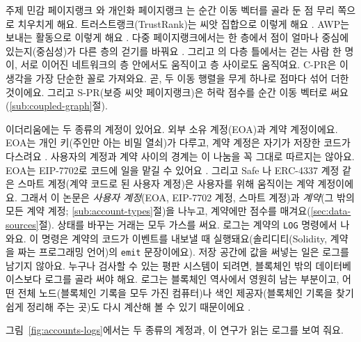 주제 민감 페이지랭크 \parencite{haveliwala2003topic}와 개인화 페이지랭크 \parencite{jeh2003personalized}는 순간 이동 벡터를 골라 둔 점 무리 쪽으로 치우치게 해요. 트러스트랭크(TrustRank)는 씨앗 집합으로 이렇게 해요 \parencite{gyongyi2004trustrank}. AWP는 보내는 활동으로 이렇게 해요 \parencite{do2023awp}. 다중 페이지랭크에서는 한 층에서 점이 얼마나 중심에 있는지(중심성)가 다른 층의 걷기를 바꿔요 \parencite{halu2013multiplex}. 그리고 \textcite{dedomenico2015ranking}의 다층 틀에서는 걷는 사람 한 명이, 서로 이어진 네트워크의 층 안에서도 움직이고 층 사이로도 움직여요. \mbox{C-PR}은 이 생각을 가장 단순한 꼴로 가져와요. 곧, 두 이동 행렬을 무게 하나로 점마다 섞어 더한 것이에요. 그리고 \mbox{S-PR}(보증 씨앗 페이지랭크)은 허락 점수를 순간 이동 벡터로 써요(\ref{sub:coupled-graph}절).


이더리움에는 두 종류의 계정이 있어요. 외부 소유 계정(EOA)과 계약 계정이에요. EOA는 개인 키(주인만 아는 비밀 열쇠)가 다루고, 계약 계정은 자기가 저장한 코드가 다스려요 \parencite{antonopoulos2018mastering}. 사용자의 계정과 계약 사이의 경계는 이 나눔을 꼭 그대로 따르지는 않아요. EOA는 EIP-7702로 코드에 일을 맡길 수 있어요 \parencite{buterin2024eip7702}. 그리고 Safe \parencite{safenddocs}나 ERC-4337 계정 \parencite{buterin2021erc4337} 같은 스마트 계정(계약 코드로 된 사용자 계정)은 사용자를 위해 움직이는 계약 계정이에요. 그래서 이 논문은 \emph{사용자 계정}(EOA, EIP-7702 계정, 스마트 계정)과 \emph{계약}(그 밖의 모든 계약 계정; \ref{sub:account-types}절)을 나누고, 계약에만 점수를 매겨요(\ref{sec:data-sources}절). 상태를 바꾸는 거래는 모두 가스를 써요. 로그는 계약의 \texttt{LOG} 명령에서 나와요. 이 명령은 계약의 코드가 이벤트를 내보낼 때 실행돼요(솔리디티(Solidity, 계약을 짜는 프로그래밍 언어)의 \texttt{emit} 문장이에요). 저장 공간에 값을 써넣는 일은 로그를 남기지 않아요. 누구나 검사할 수 있는 평판 시스템이 되려면, 블록체인 밖의 데이터베이스보다 로그를 골라 써야 해요. 로그는 블록체인 역사에서 영원히 남는 부분이고, 어떤 전체 노드(블록체인 기록을 모두 가진 컴퓨터)나 색인 제공자(블록체인 기록을 찾기 쉽게 정리해 주는 곳)도 다시 계산해 볼 수 있기 때문이에요 \parencite{wood2025yellowpaper}.

그림~\ref{fig:accounts-logs}에서는 두 종류의 계정과, 이 연구가 읽는 로그를 보여 줘요.


